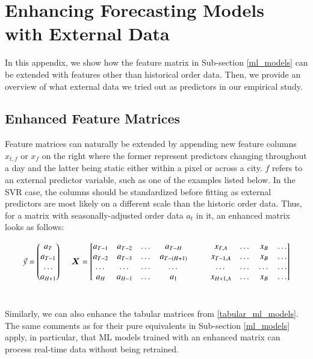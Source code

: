 \section{Enhancing Forecasting Models with External Data}
\label{enhanced_feats}

In this appendix, we show how the feature matrix in Sub-section
    \ref{ml_models} can be extended with features other than historical order
    data.
Then, we provide an overview of what external data we tried out as predictors
    in our empirical study.

\subsection{Enhanced Feature Matrices}

Feature matrices can naturally be extended by appending new feature columns
    $x_{t,f}$ or $x_f$ on the right where the former represent predictors
    changing throughout a day and the latter being static either within a
    pixel or across a city.
$f$ refers to an external predictor variable, such as one of the examples
    listed below.
In the SVR case, the columns should be standardized before fitting as external
    predictors are most likely on a different scale than the historic order
    data.
Thus, for a matrix with seasonally-adjusted order data $a_t$ in it, an
    enhanced matrix looks as follows:

$$
\vec{y}
=
\begin{pmatrix}
    a_T \\
    a_{T-1} \\
    \dots \\
    a_{H+1}
\end{pmatrix}
~~~~~
\bm{X}
=
\begin{bmatrix}
    a_{T-1}         & a_{T-2} & \dots & a_{T-H}     & ~~~
        & x_{T,A}   & \dots   & x_{B} & \dots \\
    a_{T-2}         & a_{T-3} & \dots & a_{T-(H+1)} & ~~~
        & x_{T-1,A} & \dots   & x_{B} & \dots \\
    \dots           & \dots   & \dots & \dots       & ~~~
        & \dots     & \dots   & \dots & \dots \\
    a_H             & a_{H-1} & \dots & a_1         & ~~~
        & x_{H+1,A} & \dots   & x_{B} & \dots
\end{bmatrix}
$$
\

Similarly, we can also enhance the tabular matrices from
    \ref{tabular_ml_models}.
The same comments as for their pure equivalents in Sub-section \ref{ml_models}
    apply, in particular, that ML models trained with an enhanced matrix can
    process real-time data without being retrained.
    
